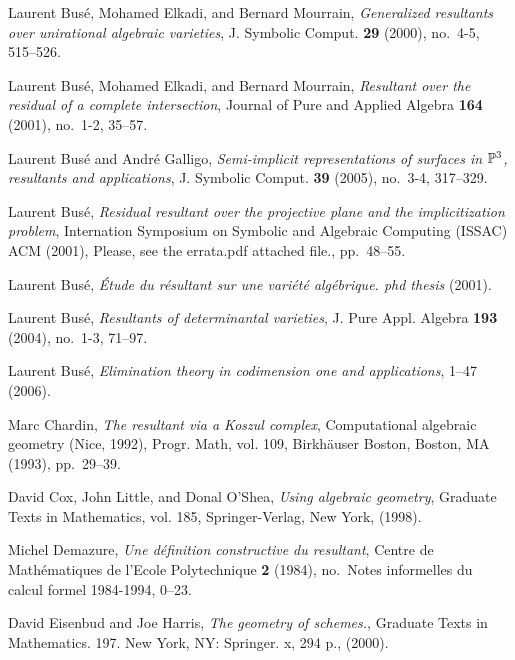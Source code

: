\documentclass[10pt]{amsart}
\theoremstyle{plain}
\theoremstyle{definition}
\begin{document}
\begin{thebibliography}{BEM01}

Laurent Bus{\'e}, Mohamed Elkadi, and Bernard Mourrain, \emph{Generalized
  resultants over unirational algebraic varieties}, J. Symbolic Comput.
  \textbf{29} (2000), no.~4-5, 515--526.
  
Laurent Bus{\'e}, Mohamed Elkadi, and Bernard Mourrain, \emph{{Resultant over the residual of a complete intersection}},
  Journal of Pure and Applied Algebra \textbf{164} (2001), no.~1-2, 35--57.

Laurent Bus{\'e} and Andr{\'e} Galligo, \emph{Semi-implicit representations of
  surfaces in {$\Bbb P^3$}, resultants and applications}, J. Symbolic Comput.
  \textbf{39} (2005), no.~3-4, 317--329.
  
Laurent Bus{\'e}, \emph{{Residual resultant over the projective plane and the
  implicitization problem}}, {Internation Symposium on Symbolic and Algebraic
  Computing (ISSAC)} ACM (2001), Please, see the
  errata.pdf attached file., pp.~48--55.

Laurent Bus{\'e}, \emph{{\'E}tude du r{\'e}sultant sur une vari{\'e}t{\'e}
  alg{\'e}brique. phd thesis} (2001).

Laurent Bus{\'e}, \emph{Resultants of determinantal varieties}, J. Pure Appl.
  Algebra \textbf{193} (2004), no.~1-3, 71--97.
  
Laurent Bus{\'e}, \emph{Elimination theory in codimension one and
  applications}, 1--47  (2006).

Marc Chardin, \emph{The resultant via a {K}oszul complex}, Computational
  algebraic geometry (Nice, 1992), Progr. Math, vol. 109, Birkh{\"a}user
  Boston, Boston, MA (1993), pp.~29--39.

David Cox, John Little, and Donal O'Shea, \emph{Using algebraic geometry},
  Graduate Texts in Mathematics, vol. 185, Springer-Verlag, New York, (1998).

Michel Demazure, \emph{Une d\'efinition constructive du resultant}, Centre de
  Math\'ematiques de l'{E}cole {P}olytechnique \textbf{2} (1984), no.~Notes
  informelles du calcul formel 1984-1994, 0--23.

David Eisenbud and Joe Harris, \emph{{The geometry of schemes.}}, {Graduate
  Texts in Mathematics. 197. New York, NY: Springer. x, 294 p.}, (2000).


\end{thebibliography}
\end{document}
